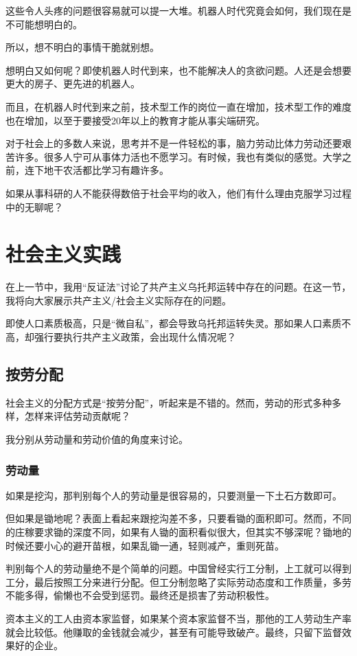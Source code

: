 这些令人头疼的问题很容易就可以提一大堆。机器人时代究竟会如何，我们现在是不可能想明白的。

所以，想不明白的事情干脆就别想。

\zPar

想明白又如何呢？即使机器人时代到来，也不能解决人的贪欲问题。人还是会想要更大的房子、更先进的机器人。

而且，在机器人时代到来之前，技术型工作的岗位一直在增加，技术型工作的难度也在增加，以至于要接受20年以上的教育才能从事尖端研究。

对于社会上的多数人来说，思考并不是一件轻松的事，脑力劳动比体力劳动还要艰苦许多。很多人宁可从事体力活也不愿学习。有时候，我也有类似的感觉。大学之前，连下地干农活都比学习有趣许多。

如果从事科研的人不能获得数倍于社会平均的收入，他们有什么理由克服学习过程中的无聊呢？

\section{社会主义实践}
在上一节中，我用“反证法”讨论了共产主义乌托邦运转中存在的问题。在这一节，我将向大家展示共产主义/社会主义实际存在的问题。

即使人口素质极高，只是“微自私”，都会导致乌托邦运转失灵。那如果人口素质不高，却强行要执行共产主义政策，会出现什么情况呢？

\subsection{按劳分配}
社会主义的分配方式是“按劳分配”，听起来是不错的。然而，劳动的形式多种多样，怎样来评估劳动贡献呢？

我分别从劳动量和劳动价值的角度来讨论。

\subsubsection{劳动量}
如果是挖沟，那判别每个人的劳动量是很容易的，只要测量一下土石方数即可。

但如果是锄地呢？表面上看起来跟挖沟差不多，只要看锄的面积即可。然而，不同的庄稼要求锄的深度不同，如果有人锄的面积看似很大，但其实不够深呢？锄地的时候还要小心的避开苗根，如果乱锄一通，轻则减产，重则死苗。

判别每个人的劳动量绝不是个简单的问题。中国曾经实行工分制，上工就可以得到工分，最后按照工分来进行分配。但工分制忽略了实际劳动态度和工作质量，多劳不能多得，偷懒也不会受到惩罚。最终还是损害了劳动积极性。

资本主义的工人由资本家监督，如果某个资本家监督不当，那他的工人劳动生产率就会比较低。他赚取的金钱就会减少，甚至有可能导致破产。最终，只留下监督效果好的企业。

